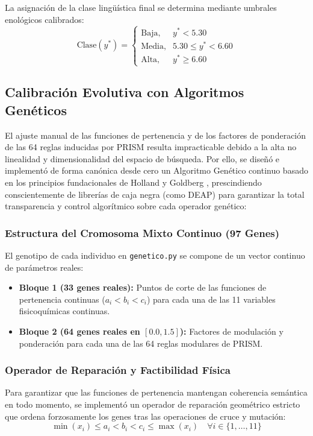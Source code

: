 \documentclass{article}
\begin{document}
La asignación de la clase lingüística final se determina mediante umbrales enológicos calibrados:
\begin{equation}
    \text{Clase}(y^*) = \begin{cases}
        \text{Baja}, & y^* < 5.30 \\
        \text{Media}, & 5.30 \le y^* < 6.60 \\
        \text{Alta}, & y^* \ge 6.60
    \end{cases}
\end{equation}

\subsection{Calibración Evolutiva con Algoritmos Genéticos}

El ajuste manual de las funciones de pertenencia y de los factores de ponderación de las 64 reglas inducidas por PRISM resulta impracticable debido a la alta no linealidad y dimensionalidad del espacio de búsqueda. Por ello, se diseñó e implementó de forma canónica desde cero un Algoritmo Genético continuo basado en los principios fundacionales de Holland \cite{holland1975adaptation} y Goldberg \cite{goldberg1989genetic}, prescindiendo conscientemente de librerías de caja negra (como DEAP) para garantizar la total transparencia y control algorítmico sobre cada operador genético:

\subsubsection{Estructura del Cromosoma Mixto Continuo (97 Genes)}
El genotipo de cada individuo en \texttt{genetico.py} se compone de un vector continuo de parámetros reales:
\begin{itemize}
    \item \textbf{Bloque 1 (33 genes reales):} Puntos de corte de las funciones de pertenencia continuas ($a_i < b_i < c_i$) para cada una de las 11 variables fisicoquímicas continuas.
    \item \textbf{Bloque 2 (64 genes reales en $[0.0, 1.5]$):} Factores de modulación y ponderación para cada una de las 64 reglas modulares de PRISM.
\end{itemize}

\subsubsection{Operador de Reparación y Factibilidad Física}
Para garantizar que las funciones de pertenencia mantengan coherencia semántica en todo momento, se implementó un operador de reparación geométrico estricto que ordena forzosamente los genes tras las operaciones de cruce y mutación:
\begin{equation}
    \min(x_i) \le a_i < b_i < c_i \le \max(x_i) \quad \forall i \in \{1, \dots, 11\}
\end{equation}
\end{document}
